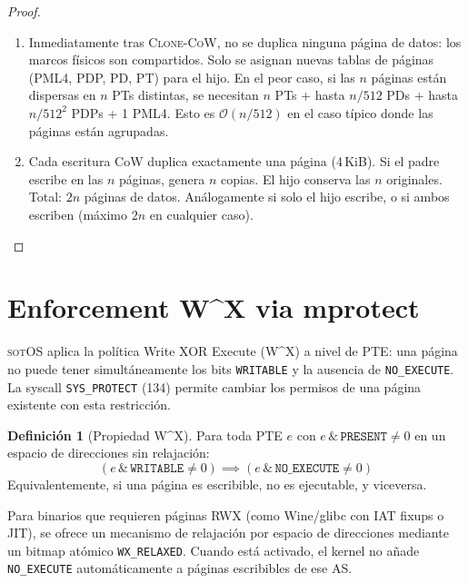 \documentclass[11pt,twoside,openright]{book}
\theoremstyle{definition}
\newtheorem{definition}{Definición}[chapter]
\theoremstyle{plain}
\theoremstyle{remark}
\newcommand{\sotos}{\textsc{sotOS}}
\newcommand{\bigO}{\mathcal{O}}
\begin{document}
\begin{proof}
\begin{enumerate}
    \item Inmediatamente tras \textsc{Clone-CoW}, no se duplica ninguna página
          de datos: los marcos físicos son compartidos. Solo se asignan nuevas
          tablas de páginas (PML4, PDP, PD, PT) para el hijo. En el peor caso,
          si las $n$ páginas están dispersas en $n$ PTs distintas, se necesitan
          $n$ PTs + hasta $n/512$ PDs + hasta $n/512^2$ PDPs + 1 PML4.
          Esto es $\bigO(n/512)$ en el caso típico donde las páginas están
          agrupadas.

    \item Cada escritura CoW duplica exactamente una página (4\,KiB). Si el padre
          escribe en las $n$ páginas, genera $n$ copias. El hijo conserva las $n$
          originales. Total: $2n$ páginas de datos. Análogamente si solo el hijo
          escribe, o si ambos escriben (máximo $2n$ en cualquier caso). \qedhere
\end{enumerate}
\end{proof}

\section{Enforcement W\^{}X via mprotect}
\label{sec:wx}

\sotos{} aplica la política Write XOR Execute (W\^{}X) a nivel de PTE: una página
no puede tener simultáneamente los bits \texttt{WRITABLE} y la ausencia de
\texttt{NO\_EXECUTE}. La syscall \texttt{SYS\_PROTECT} (134) permite cambiar los
permisos de una página existente con esta restricción.

\begin{definition}[Propiedad W\^{}X]
Para toda PTE $e$ con $e \,\texttt{\&}\, \texttt{PRESENT} \neq 0$ en un espacio
de direcciones sin relajación:
\[
(e \,\texttt{\&}\, \texttt{WRITABLE} \neq 0) \implies (e \,\texttt{\&}\, \texttt{NO\_EXECUTE} \neq 0)
\]
Equivalentemente, si una página es escribible, no es ejecutable, y viceversa.
\end{definition}

Para binarios que requieren páginas RWX (como Wine/glibc con IAT fixups o JIT),
se ofrece un mecanismo de relajación por espacio de direcciones mediante un bitmap
atómico \texttt{WX\_RELAXED}. Cuando está activado, el kernel no añade
\texttt{NO\_EXECUTE} automáticamente a páginas escribibles de ese AS.
\end{document}
